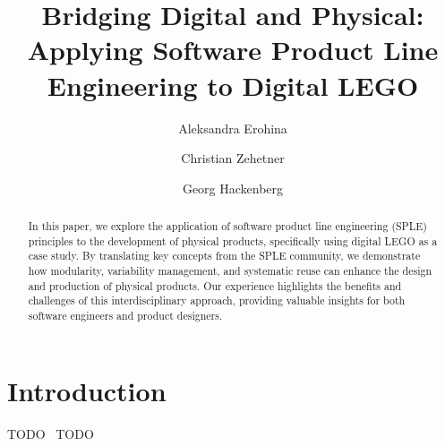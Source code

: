 \documentclass[sigconf,review]{acmart}
\begin{document}
\title{Bridging Digital and Physical: Applying Software Product Line Engineering to Digital LEGO}

\author{Aleksandra Erohina}

\author{Christian Zehetner}

\author{Georg Hackenberg}

\begin{abstract}
    In this paper, we explore the application of software product line engineering (SPLE) principles to the development of physical products, specifically using digital LEGO as a case study. 
    By translating key concepts from the SPLE community, we demonstrate how modularity, variability management, and systematic reuse can enhance the design and production of physical products. 
    Our experience highlights the benefits and challenges of this interdisciplinary approach, providing valuable insights for both software engineers and product designers.
\end{abstract}


\maketitle

\section{Introduction}
\label{sec:introduction}

TODO~\cite{Hackenberg_2023} TODO~\cite{Baldwin_1997}
\end{document}
